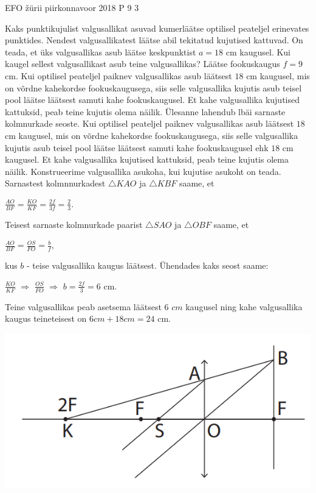 {EFO žürii} %
{piirkonnavoor} %
{2018} %
{P 9} %
{3} %
{
\ifStatement
Kaks punktikujulist valgusallikat asuvad kumerläätse optilisel peateljel erinevates punktides. Nendest valgusallikatest läätse abil tekitatud kujutised kattuvad. On teada, et üks valgusallikas asub läätse keskpunktist $a = 18$ cm kaugusel. Kui kaugel sellest valgusallikast asub teine valgusallikas? Läätse fookuskaugus $f = 9$ cm.
\fi
\ifHint
Kui optilisel peateljel paiknev valgusallikas asub läätsest $18$ cm kaugusel, mis on võrdne kahekordse fookuskaugusega, siis selle valgusallika kujutis asub teisel pool läätse läätsest samuti kahe fookuskaugusel. Et kahe valgusallika kujutised kattuksid, peab teine kujutis olema näilik. Ülesanne lahendub lbäi sarnaste kolmnurkade seoste.
\fi
\ifSolution
Kui optilisel peateljel paiknev valgusallikas asub läätsest $18$ cm kaugusel, mis on võrdne kahekordse fookuskaugusega, siis selle valgusallika kujutis asub teisel pool läätse läätsest samuti kahe fookuskaugusel ehk $18$ cm kaugusel. Et kahe valgusallika kujutised kattuksid, peab teine kujutis olema näilik. Konstrueerime valgusallika asukoha, kui kujutise asukoht on teada.
Sarnastest kolmnnurkadest $\triangle KAO$ ja $\triangle KBF$ saame, et 
\begin{center}
$\frac{AO}{BF} = \frac{KO}{KF} = \frac{2f}{3f} = \frac{2}{3}$.
\end{center}
Teisest sarnaste kolmnurkade paarist $\triangle SAO$ ja $\triangle OBF$ saame, et 
\begin{center}
$\frac{AO}{BF} = \frac{OS}{FO} = \frac{b}{f}$,
\end{center}
kus $b$ - teise valgusallika kaugus läätsest. Ühendades kaks seost saame:
\begin{center}
$\frac{KO}{KF}$ $\Rightarrow$ $\frac{OS}{FO}$ $\Rightarrow$ $b = \frac{2f}{3} = 6$ cm.
\end{center}
Teine valgusallikas peab asetsema läätsest $6$ $cm$ kaugusel ning kahe valgusallika kaugus teineteisest on $6 cm + 18 cm = 24$ cm.
\begin{center}
	\includegraphics[width=0.5\linewidth]{2018-v2p-09-lah.PNG}
\end{center}
\fi
}
